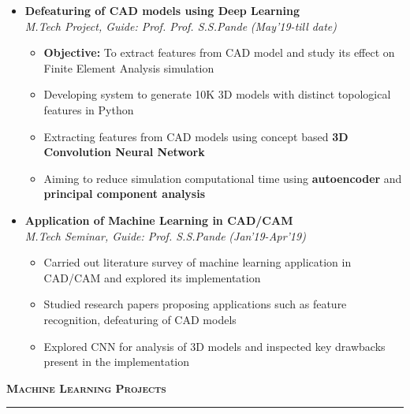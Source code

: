 \documentclass[a4paper,10pt]{article}
\newcommand{\isep}{-2 pt}
\newcommand{\lsep}{-0.5cm}
\newcommand{\resheading}[1]{{\small
        {
            \begin{minipage}
                {0.992\textwidth}\textbf{{\textsc{#1 \vphantom{p\^{E}} }}}
                \\[-0.3cm]
                \hrule
            \end{minipage}
            \\[-0.5cm]
        }
 }}
\begin{document}
\begin{itemize}
\item \textbf{Defeaturing of CAD models using Deep Learning}  \\
    \emph{M.Tech Project, Guide: Prof. Prof. S.S.Pande} \hfill \emph{(May'19-till date)}
    \\[-0.6cm]
    \begin{itemize}\itemsep \isep
        \item \textbf{Objective:} To extract features from CAD model and study its effect on Finite Element Analysis simulation
	    \item Developing system to generate 10K 3D models with distinct topological features in Python
	    \item Extracting features from CAD models using concept based \textbf{3D Convolution Neural Network}
	    \item Aiming to reduce simulation computational time using \textbf{autoencoder} and \textbf{principal component analysis}
    \end{itemize}

\item \textbf{Application of Machine Learning in CAD/CAM} \\
    \emph{M.Tech Seminar, Guide:  Prof. S.S.Pande}
    \hfill \emph{(Jan'19-Apr'19)}
    \\ [-0.6cm]
      \begin{itemize}\itemsep \isep
        \item Carried out literature survey of machine learning application in CAD/CAM and explored its implementation %
     \item Studied research papers proposing applications such as feature recognition, defeaturing of CAD models
    \item Explored CNN for analysis of 3D models and inspected key drawbacks present in the implementation
	\end{itemize}
\end{itemize}
\resheading{\textbf{\large Machine Learning Projects}}\\[\lsep]
\\[-0.2cm]
\end{document}
